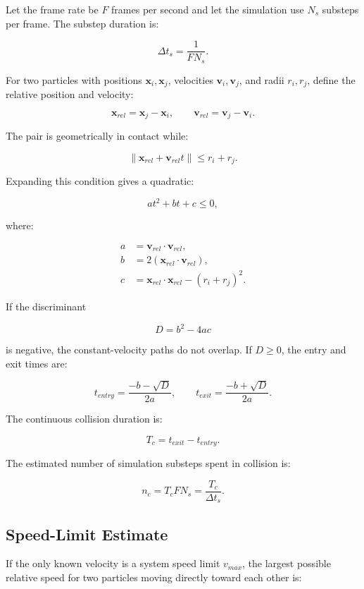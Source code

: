 \documentclass[11pt]{article}
\begin{document}
Let the frame rate be \(F\) frames per second and let the simulation use \(N_s\)
substeps per frame. The substep duration is:

\[
    \Delta t_s
    =
    \frac{1}{F N_s}.
\]

For two particles with positions \(\mathbf{x}_i,\mathbf{x}_j\), velocities
\(\mathbf{v}_i,\mathbf{v}_j\), and radii \(r_i,r_j\), define the relative
position and velocity:

\[
    \mathbf{x}_{rel}
    =
    \mathbf{x}_j-\mathbf{x}_i,
    \qquad
    \mathbf{v}_{rel}
    =
    \mathbf{v}_j-\mathbf{v}_i.
\]

The pair is geometrically in contact while:

\[
    \|\mathbf{x}_{rel}+\mathbf{v}_{rel}t\|
    \le
    r_i+r_j.
\]

Expanding this condition gives a quadratic:

\[
    at^2+bt+c \le 0,
\]

where:

\[
\begin{aligned}
    a &= \mathbf{v}_{rel}\cdot\mathbf{v}_{rel},\\
    b &= 2(\mathbf{x}_{rel}\cdot\mathbf{v}_{rel}),\\
    c &= \mathbf{x}_{rel}\cdot\mathbf{x}_{rel}-(r_i+r_j)^2.
\end{aligned}
\]

If the discriminant

\[
    D=b^2-4ac
\]

is negative, the constant-velocity paths do not overlap. If \(D\ge 0\), the
entry and exit times are:

\[
    t_{entry}
    =
    \frac{-b-\sqrt{D}}{2a},
    \qquad
    t_{exit}
    =
    \frac{-b+\sqrt{D}}{2a}.
\]

The continuous collision duration is:

\[
    T_c
    =
    t_{exit}-t_{entry}.
\]

The estimated number of simulation substeps spent in collision is:

\[
    n_c
    =
    T_c F N_s
    =
    \frac{T_c}{\Delta t_s}.
\]

\subsection{Speed-Limit Estimate}

If the only known velocity is a system speed limit \(v_{max}\), the largest
possible relative speed for two particles moving directly toward each other is:
\end{document}
